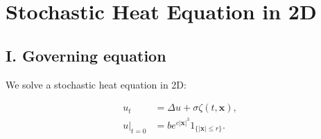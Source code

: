 \documentclass[
]{article}
\date{}
\begin{document}
\hypertarget{header-n133}{%
\section{Stochastic Heat Equation in 2D}\label{header-n133}}

\hypertarget{header-n2}{%
\subsection{I. Governing equation}\label{header-n2}}

We solve a stochastic heat equation in 2D:

\begin{align}
u_{t}&= \Delta u+\sigma \zeta(t,\mathbf{x}), \\
u|_{t=0} &= b e^{c |\mathbf{x}|^{3}} 1_{\{|\mathbf{x}| \leq r\}}. \\
\end{align}
\end{document}
